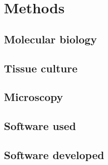 \chapter{Methods}
\label{ch:methods}

\section{Molecular biology}
\section{Tissue culture}
\section{Microscopy}
\section{Software used}
\section{Software developed}

